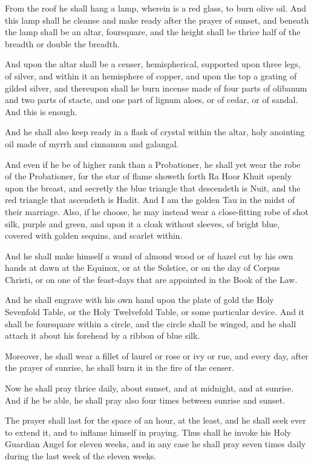 From the roof he shall hang a lamp, wherein is a red glass, to burn olive oil. And this lamp shall he cleanse and make ready after the prayer of sunset, and beneath the lamp shall be an altar, foursquare, and the height shall be thrice half of the breadth or double the breadth.

And upon the altar shall be a censer, hemispherical, supported upon three legs, of silver, and within it an hemisphere of copper, and upon the top a grating of gilded silver, and thereupon shall he burn incense made of four parts of olibanum and two parts of stacte, and one part of lignum aloes, or of cedar, or of sandal. And this is enough.

And he shall also keep ready in a flask of crystal within the altar, holy anointing oil made of myrrh and cinnamon and galangal.

And even if he be of higher rank than a Probationer, he shall yet wear the robe of the Probationer, for the star of flame showeth forth Ra Hoor Khuit openly upon the breast, and secretly the blue triangle that descendeth is Nuit, and the red triangle that ascendeth is Hadit. And I am the golden Tau in the midst of their marriage. Also, if he choose, he may instead wear a close-fitting robe of shot silk, purple and green, and upon it a cloak without sleeves, of bright blue, covered with golden sequins, and scarlet within.

And he shall make himself a wand of almond wood or of hazel cut by his own hands at dawn at the Equinox, or at the Solstice, or on the day of Corpus Christi, or on one of the feast-days that are appointed in the Book of the Law.

And he shall engrave with his own hand upon the plate of gold the Holy Sevenfold Table, or the Holy Twelvefold Table, or some particular device. And it shall be foursquare within a circle, and the circle shall be winged, and he shall attach it about his forehead by a ribbon of blue silk.

Moreover, he shall wear a fillet of laurel or rose or ivy or rue, and every day, after the prayer of sunrise, he shall burn it in the fire of the censer.

Now he shall pray thrice daily, about sunset, and at midnight, and at sunrise. And if he be able, he shall pray also four times between sunrise and sunset.

The prayer shall last for the space of an hour, at the least, and he shall seek ever to extend it, and to inflame himself in praying. Thus shall he invoke his Holy Guardian Angel for eleven weeks, and in any case he shall pray seven times daily during the last week of the eleven weeks.

